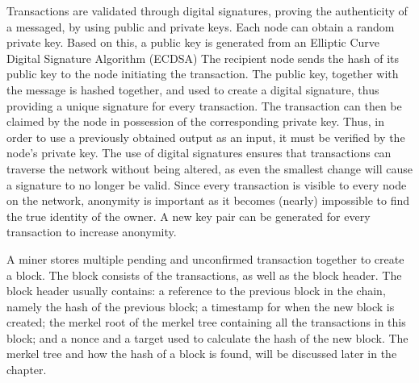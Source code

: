 Transactions are validated through digital signatures, proving the authenticity of a messaged, by using public and private keys. Each node can obtain a random private key. Based on this, a public key is generated from an Elliptic Curve Digital Signature Algorithm (ECDSA) %
The recipient node sends the hash of its public key to the node initiating the transaction. The public key, together with the message is hashed together, and used to create a digital signature, thus providing a unique signature for every transaction. The transaction can then be claimed by the node in possession of the corresponding private key. Thus, in order to use a previously obtained output as an input, it must be verified by the node's private key. The use of digital signatures ensures that transactions can traverse the network without being altered, as even the smallest change will cause a signature to no longer be valid. Since every transaction is visible to every node on the network, anonymity is important as it becomes (nearly) %
impossible to find the true identity of the owner. A new key pair can be generated for every transaction to increase anonymity.

A miner stores multiple pending and unconfirmed transaction together to create a block. The block consists of the transactions, as well as the block header. The block header usually contains: a reference to the previous block in the chain, namely the hash of the previous block; a timestamp for when the new block is created; the merkel root of the merkel tree containing all the transactions in this block; and  a nonce and a target used to calculate the hash of the new block. The merkel tree and how the hash of a block is found, will be discussed later in the chapter.

